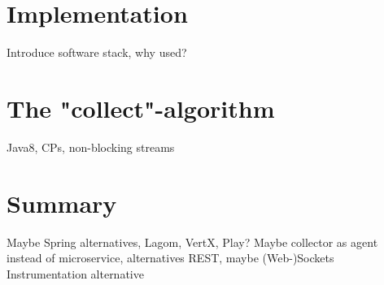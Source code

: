\section{Implementation}

Introduce software stack, why used?

\section{The "collect"-algorithm}

Java8, CPs, non-blocking streams


\section{Summary}

Maybe Spring alternatives, Lagom, VertX, Play?
Maybe collector as agent instead of microservice, alternatives REST, maybe (Web-)Sockets
Instrumentation alternative

